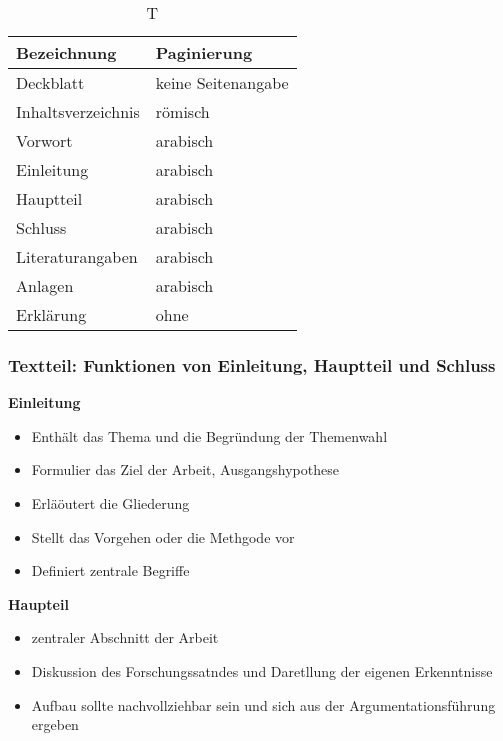 \begin{table}[!htbp] %
	\caption[T]{T}	%
	\medskip 
	\centering 
	\begin{tabular} {ll}
		\toprule %
Bezeichnung & Paginierung\\
		\midrule
Deckblatt & keine Seitenangabe\\
Inhaltsverzeichnis & römisch\\
Vorwort & arabisch\\
Einleitung & arabisch\\
Hauptteil & arabisch\\
Schluss & arabisch\\
Literaturangaben & arabisch\\
Anlagen & arabisch\\
Erklärung & ohne\\
		\bottomrule
	\end{tabular}
\end{table}

\subsubsection{Textteil: Funktionen von Einleitung, Hauptteil und
Schluss}\label{textteil-funktionen-von-einleitung-hauptteil-und-schluss}

\textbf{Einleitung}

\begin{itemize}%
\item
  Enthält das Thema und die Begründung der Themenwahl
\item
  Formulier das Ziel der Arbeit, Ausgangshypothese
\item
  Erläöutert die Gliederung
\item
  Stellt das Vorgehen oder die Methgode vor
\item
  Definiert zentrale Begriffe
\end{itemize}

\textbf{Haupteil}

\begin{itemize}%
\item
  zentraler Abschnitt der Arbeit
\item
  Diskussion des Forschungssatndes und Daretllung der eigenen
  Erkenntnisse
\item
  Aufbau sollte nachvollziehbar sein und sich aus der
  Argumentationsführung ergeben
\end{itemize}

